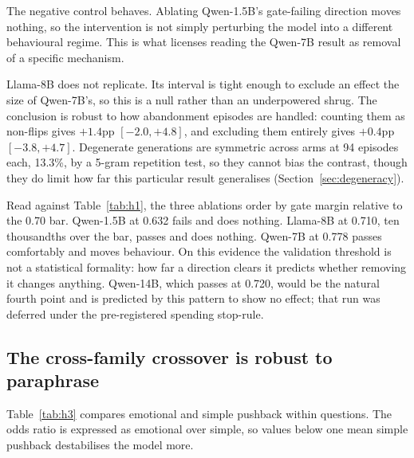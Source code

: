 The negative control behaves. Ablating Qwen-1.5B's gate-failing direction moves nothing, so
the intervention is not simply perturbing the model into a different behavioural regime.
This is what licenses reading the Qwen-7B result as removal of a specific mechanism.

Llama-8B does not replicate. Its interval is tight enough to exclude an effect the size of
Qwen-7B's, so this is a null rather than an underpowered shrug. The conclusion is robust to
how abandonment episodes are handled: counting them as non-flips gives $+1.4$pp
$[-2.0, +4.8]$, and excluding them entirely gives $+0.4$pp $[-3.8, +4.7]$. Degenerate
generations are symmetric across arms at 94 episodes each, 13.3\%, by a 5-gram repetition
test, so they cannot bias the contrast, though they do limit how far this particular result
generalises (Section~\ref{sec:degeneracy}).

Read against Table~\ref{tab:h1}, the three ablations order by gate margin relative to the
0.70 bar. Qwen-1.5B at 0.632 fails and does nothing. Llama-8B at 0.710, ten thousandths over
the bar, passes and does nothing. Qwen-7B at 0.778 passes comfortably and moves behaviour.
On this evidence the validation threshold is not a statistical formality: how far a direction
clears it predicts whether removing it changes anything. Qwen-14B, which passes at 0.720,
would be the natural fourth point and is predicted by this pattern to show no effect; that
run was deferred under the pre-registered spending stop-rule.

\subsection{The cross-family crossover is robust to paraphrase}
\label{sec:h3res}

Table~\ref{tab:h3} compares emotional and simple pushback within questions. The odds ratio
is expressed as emotional over simple, so values below one mean simple pushback destabilises
the model more.

